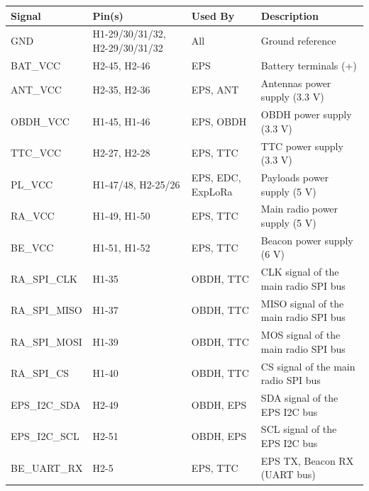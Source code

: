 \begin{table}[!ht]
    \small
    \centering
    \begin{tabular}{lL{0.18\textwidth}L{0.19\textwidth}L{0.33\textwidth}}
        \toprule[1.5pt]
        \textbf{Signal}  & \textbf{Pin(s)} & \textbf{Used By}     & \textbf{Description} \\
        \midrule
        GND              & H1-29/30/31/32, H2-29/30/31/32 & All   & Ground reference \\
        BAT\_VCC         & H2-45, H2-46    & \ac{EPS}                  & Battery terminals (+) \\
        ANT\_VCC         & H2-35, H2-36    & \ac{EPS}, ANT             & Antennas power supply (3.3 V) \\
        OBDH\_VCC        & H1-45, H1-46    & \ac{EPS}, \ac{OBDH}            & \ac{OBDH} power supply (3.3 V) \\
        TTC\_VCC         & H2-27, H2-28    & \ac{EPS}, \ac{TTC}             & \ac{TTC} power supply (3.3 V) \\
        PL\_VCC          & H1-47/48, H2-25/26 & \ac{EPS}, \ac{EDC}, ExpLoRa & Payloads power supply (5 V) \\
        RA\_VCC          & H1-49, H1-50    & \ac{EPS}, \ac{TTC}             & Main radio power supply (5 V) \\
        BE\_VCC          & H1-51, H1-52    & \ac{EPS}, \ac{TTC}             & Beacon power supply (6 V) \\
        RA\_SPI\_CLK     & H1-35           & \ac{OBDH}, \ac{TTC}            & CLK signal of the main radio SPI bus \\
        RA\_SPI\_MISO    & H1-37           & \ac{OBDH}, \ac{TTC}            & MISO signal of the main radio SPI bus \\
        RA\_SPI\_MOSI    & H1-39           & \ac{OBDH}, \ac{TTC}            & MOS signal of the main radio SPI bus \\
        RA\_SPI\_CS      & H1-40           & \ac{OBDH}, \ac{TTC}            & CS signal of the main radio SPI bus \\
        EPS\_I2C\_SDA    & H2-49           & \ac{OBDH}, \ac{EPS}            & SDA signal of the \ac{EPS} I2C bus \\
        EPS\_I2C\_SCL    & H2-51           & \ac{OBDH}, \ac{EPS}            & SCL signal of the \ac{EPS} I2C bus \\
        BE\_UART\_RX     & H2-5            & \ac{EPS}, \ac{TTC}             & \ac{EPS} TX, Beacon RX (UART bus) \\

\end{tabular}
\end{table}
